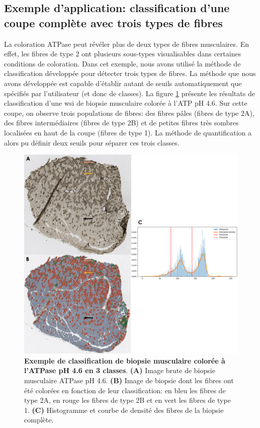 \subsection{Exemple d'application: classification d'une coupe complète avec trois types de fibres}
La coloration ATPase peut révéler plus de deux types de fibres musculaires. En effet, les fibres de type 2 ont plusieurs sous-types visualisables dans certaines conditions de coloration. Dans cet exemple, nous avons utilisé la méthode de classification développée pour détecter trois types de fibres. La méthode que nous avons développée est capable d'établir autant de seuils automatiquement que spécifiés par l'utilisateur (et donc de classes). La figure \ref{fig:atp_paint_wsi} présente les résultats de classification d'une \gls{wsi} de biopsie musculaire colorée à l'ATP pH 4.6. Sur cette coupe, on observe trois populations de fibres: des fibres pâles (fibres de type 2A), des fibres intermédiaires (fibres de type 2B) et de petites fibres très sombres localisées en haut de la coupe (fibres de type 1). La méthode de quantification a alors pu définir deux seuils pour séparer ces trois classes. 
\begin{figure}[!ht]
 \centering
 \includegraphics[width=1\textwidth]{figures/atp_wsi.png}
 \caption[Exemple de classification de biopsie musculaire colorée à l'ATPase]{\textbf{Exemple de classification de biopsie musculaire colorée à l'ATPase pH 4.6 en 3 classes}. \textbf{(A)} Image brute de biopsie musculaire ATPase pH 4.6. \textbf{(B)} Image de biopsie dont les fibres ont été colorées en fonction de leur classification: en bleu les fibres de type 2A, en rouge les fibres de type 2B et en vert les fibres de type 1. \textbf{(C)} Histogramme et courbe de densité des fibres de la biopsie complète.}
 \label{fig:atp_paint_wsi}
\end{figure}

